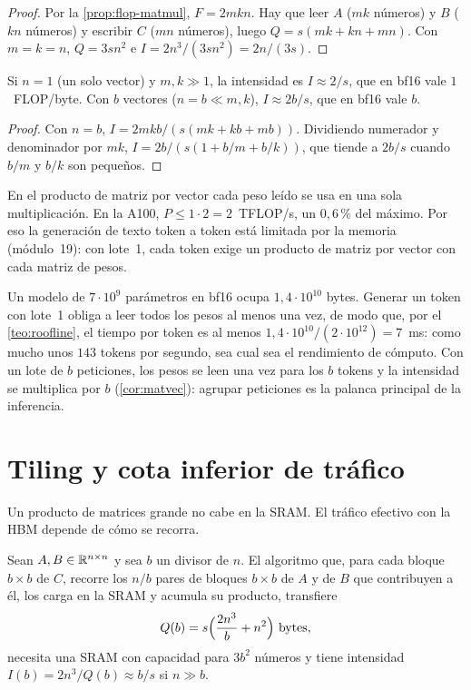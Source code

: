 \begin{proof}
Por la \cref{prop:flop-matmul}, $F=2mkn$. Hay que leer $A$ ($mk$ números) y $B$ ($kn$ números) y escribir $C$ ($mn$ números), luego $Q=s(mk+kn+mn)$. Con $m=k=n$, $Q=3sn^{2}$ e $I=2n^{3}/(3sn^{2})=2n/(3s)$.
\end{proof}

\begin{corolario}\label{cor:matvec}
Si $n=1$ (un solo vector) y $m,k\gg 1$, la intensidad es $I\approx 2/s$, que en bf16 vale $1$~FLOP/byte. Con $b$ vectores ($n=b\ll m,k$), $I\approx 2b/s$, que en bf16 vale $b$.
\end{corolario}

\begin{proof}
Con $n=b$, $I=2mkb/(s(mk+kb+mb))$. Dividiendo numerador y denominador por $mk$, $I=2b/(s(1+b/m+b/k))$, que tiende a $2b/s$ cuando $b/m$ y $b/k$ son pequeños.
\end{proof}

En el producto de matriz por vector cada peso leído se usa en una sola multiplicación. En la A100, $P\le 1\cdot 2=2$~TFLOP/s, un $0{,}6\,\%$ del máximo. Por eso la generación de texto token a token está limitada por la memoria (módulo~19): con lote~1, cada token exige un producto de matriz por vector con cada matriz de pesos.

\begin{ejemplo}\label{ej:decode}
Un modelo de $7\cdot 10^{9}$ parámetros en bf16 ocupa $1{,}4\cdot 10^{10}$ bytes. Generar un token con lote~1 obliga a leer todos los pesos al menos una vez, de modo que, por el \cref{teo:roofline}, el tiempo por token es al menos $1{,}4\cdot 10^{10}/(2\cdot 10^{12})=7$~ms: como mucho unos $143$ tokens por segundo, sea cual sea el rendimiento de cómputo. Con un lote de $b$ peticiones, los pesos se leen una vez para los $b$ tokens y la intensidad se multiplica por $b$ (\cref{cor:matvec}): agrupar peticiones es la palanca principal de la inferencia.
\end{ejemplo}

\section{Tiling y cota inferior de tráfico}

Un producto de matrices grande no cabe en la SRAM. El tráfico efectivo con la HBM depende de cómo se recorra.

\begin{proposicion}\label{prop:tiling}
Sean $A,B\in\mathbb{R}^{n\times n}$ y sea $b$ un divisor de $n$. El algoritmo que, para cada bloque $b\times b$ de $C$, recorre los $n/b$ pares de bloques $b\times b$ de $A$ y de $B$ que contribuyen a él, los carga en la SRAM y acumula su producto, transfiere
\[
Q(b)=s\Bigl(\frac{2n^{3}}{b}+n^{2}\Bigr)\ \text{bytes},
\]
necesita una SRAM con capacidad para $3b^{2}$ números y tiene intensidad $I(b)=2n^{3}/Q(b)\approx b/s$ si $n\gg b$.
\end{proposicion}

